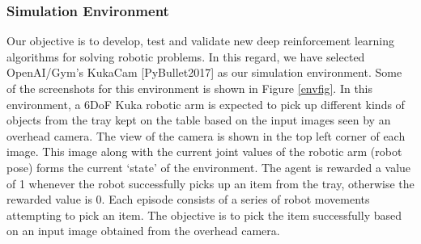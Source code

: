 \documentclass{article}
\begin{document}
\subsubsection{Simulation Environment}
Our objective is to develop, test and validate new deep reinforcement learning algorithms for solving robotic problems. In this regard, we have selected OpenAI/Gym’s KukaCam [PyBullet2017] as our simulation environment. Some of the screenshots for this environment is shown in Figure \ref{envfig}. In this environment, a 6DoF Kuka robotic arm is expected to pick up different kinds of objects from the tray kept on the table based on the input images seen by an overhead camera. The view of the camera is shown in the top left corner of each image. This image along with the current joint values of the robotic arm (robot pose) forms the current ‘state’ of the environment. The agent is rewarded a value of 1 whenever the robot successfully picks up an item from the tray, otherwise the rewarded value is 0. Each episode consists of a series of robot movements attempting to pick an item. The objective is to pick the item successfully based on an input image obtained from the overhead camera.
\end{document}
